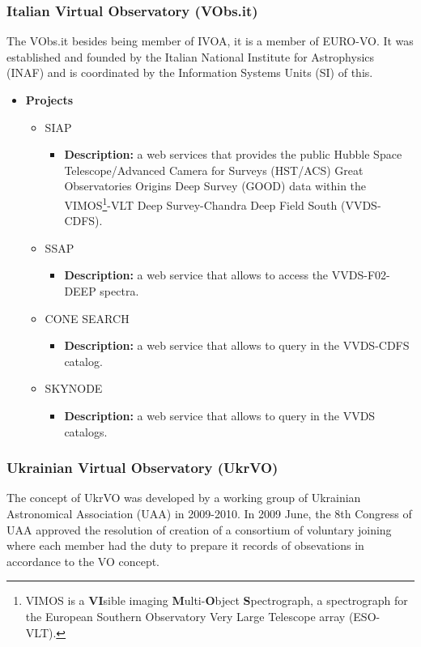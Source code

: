 \subsubsection{Italian Virtual Observatory (VObs.it)}
The VObs.it \cite{website:vobs.it-home} besides being member of IVOA, it is a
member of EURO-VO. It was established and founded by the Italian National
Institute for Astrophysics (INAF) and is coordinated by the Information Systems
Units (SI) of this. 

\begin{itemize}
\item \textbf{Projects}
\begin{itemize}
\item SIAP
\begin{itemize}
\item \textbf{Description:} a web services that provides the public Hubble Space
Telescope/Advanced Camera for Surveys (HST/ACS) Great Observatories Origins Deep
Survey (GOOD) data within the VIMOS\footnote{VIMOS is a \textbf{VI}sible imaging
\textbf{M}ulti-\textbf{O}bject \textbf{S}pectrograph, a spectrograph for the
European Southern Observatory Very Large Telescope array (ESO-VLT).}-VLT Deep
Survey-Chandra Deep Field South (VVDS-CDFS).
\end{itemize}
\item SSAP
\begin{itemize}
\item \textbf{Description:} a web service that allows to access the
VVDS-F02-DEEP spectra.
\end{itemize}
\item CONE SEARCH
\begin{itemize}
\item \textbf{Description:} a web service that allows to query in the VVDS-CDFS
catalog. 
\end{itemize}
\item SKYNODE
\begin{itemize}
\item \textbf{Description:} a web service that allows to query in the VVDS
catalogs. 
\end{itemize}
\end{itemize}
\end{itemize}

\subsubsection{Ukrainian Virtual Observatory (UkrVO)}
The concept of UkrVO \cite{website:ukrvo-home} was developed by a working group
of Ukrainian Astronomical Association (UAA) in 2009-2010. In 2009 June, the 8th
Congress of UAA approved the resolution of creation of a consortium of voluntary
joining where each member had the duty to prepare it records of obsevations in
accordance to the VO concept. 

